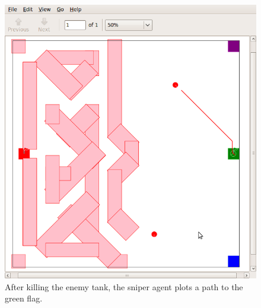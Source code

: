 \begin{figure}\label{fig:kill}
\begin{center}
\includegraphics[width=\textwidth]{05kill.png}
\caption{After killing the enemy tank, the sniper agent plots a path to the green flag.}
\end{center}
\end{figure}

